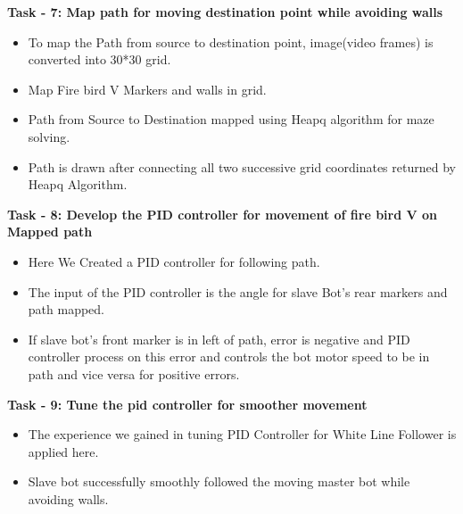 \documentclass[report]{res}
\begin{document}
	{\Large \textbf{Task - 7: Map path for moving destination point while avoiding walls}} \\
	
		\begin{itemize}
			
		\item To map the Path from source to destination point, image(video frames) is converted into 30*30 grid. \item Map Fire bird V Markers and walls in grid. 
		\item Path from Source to Destination mapped using Heapq algorithm for maze solving.
		\item Path is drawn after connecting all two successive grid coordinates returned by Heapq Algorithm.\\
		
		\end{itemize}
		
	{\Large \textbf{Task - 8: Develop the PID controller for movement of fire bird V on Mapped path}} \\
		
		\begin{itemize}
		
		\item Here We Created a PID controller for following path. 
		\item The input of the PID controller is the angle for slave Bot's rear markers and path mapped. 
		\item If slave bot's front marker is in left of path, error is negative and PID controller process on this error and controls the bot motor speed to be in path and vice versa for positive errors.\\
		
		\end{itemize}
		
	{\Large \textbf{Task - 9: Tune the pid controller for smoother movement}} \\
	
		\begin{itemize}
			
		\item The experience we gained in tuning PID Controller for White Line Follower is applied here. 
		\item Slave bot successfully smoothly followed the moving master bot while avoiding walls.\\
	
		\end{itemize}
		
\end{document}
